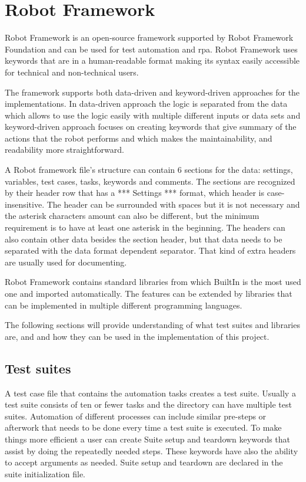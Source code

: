 \section{Robot Framework}
Robot Framework is an open-source framework supported by Robot Framework Foundation and can be used for test automation and \gls{rpa}.
Robot Framework uses keywords that are in a human-readable format making its syntax easily accessible for technical and non-technical users.

The framework supports both data-driven and keyword-driven approaches for the implementations.
In data-driven approach the logic is separated from the data which allows to use the logic easily with multiple different inputs or data sets and keyword-driven approach focuses on creating keywords that give summary of the actions that the robot performs and which makes the maintainability, and readability more straightforward.

A Robot framework file's structure can contain 6 sections for the data: settings, variables, test cases, tasks, keywords and comments.
The sections are recognized by their header row that has a *** Settings *** format, which header is case-insensitive. The header can be surrounded with spaces but it is not necessary and the asterisk characters amount can also be different, but the minimum requirement is to have at least one asterisk in the beginning.
The headers can also contain other data besides the section header, but that data needs to be separated with the data format dependent separator.
That kind of extra headers are usually used for documenting.

Robot Framework contains standard libraries from which BuiltIn is the most used one and imported automatically.
The features can be extended by libraries that can be implemented in multiple different programming languages.

The following sections will provide understanding of what test suites and libraries are, and and how they can be used in the implementation of this project.

\subsection{Test suites}
A test case file that contains the automation tasks creates a test suite. Usually a test suite consists of ten or fewer tasks and the directory can have multiple test suites.
Automation of different processes can include similar pre-steps or afterwork that needs to be done every time a test suite is executed.
To make things more efficient a user can create Suite setup and teardown keywords that assist by doing the repeatedly needed steps.
These keywords have also the ability to accept arguments as needed.
Suite setup and teardown are declared in the suite initialization file.

